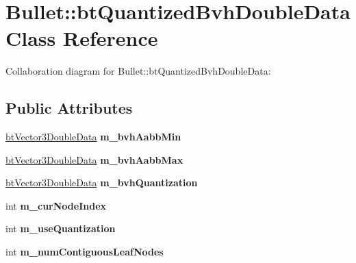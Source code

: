 \hypertarget{class_bullet_1_1bt_quantized_bvh_double_data}{\section{Bullet\+:\+:bt\+Quantized\+Bvh\+Double\+Data Class Reference}
\label{class_bullet_1_1bt_quantized_bvh_double_data}
}


Collaboration diagram for Bullet\+:\+:bt\+Quantized\+Bvh\+Double\+Data\+:
\subsection*{Public Attributes}
\begin{DoxyCompactItemize}
\item 
\hypertarget{class_bullet_1_1bt_quantized_bvh_double_data_a1a8746a4caf220282b2a420b78a5dea5}{\hyperlink{class_bullet_1_1bt_vector3_double_data}{bt\+Vector3\+Double\+Data} {\bfseries m\+\_\+bvh\+Aabb\+Min}}\label{class_bullet_1_1bt_quantized_bvh_double_data_a1a8746a4caf220282b2a420b78a5dea5}

\item 
\hypertarget{class_bullet_1_1bt_quantized_bvh_double_data_a2116db5fae8bed0f51c2e18695ce104f}{\hyperlink{class_bullet_1_1bt_vector3_double_data}{bt\+Vector3\+Double\+Data} {\bfseries m\+\_\+bvh\+Aabb\+Max}}\label{class_bullet_1_1bt_quantized_bvh_double_data_a2116db5fae8bed0f51c2e18695ce104f}

\item 
\hypertarget{class_bullet_1_1bt_quantized_bvh_double_data_a043f201aac3864d7900ea4fbeaae5122}{\hyperlink{class_bullet_1_1bt_vector3_double_data}{bt\+Vector3\+Double\+Data} {\bfseries m\+\_\+bvh\+Quantization}}\label{class_bullet_1_1bt_quantized_bvh_double_data_a043f201aac3864d7900ea4fbeaae5122}

\item 
\hypertarget{class_bullet_1_1bt_quantized_bvh_double_data_a530234283e226efd05f267ed1e249698}{int {\bfseries m\+\_\+cur\+Node\+Index}}\label{class_bullet_1_1bt_quantized_bvh_double_data_a530234283e226efd05f267ed1e249698}

\item 
\hypertarget{class_bullet_1_1bt_quantized_bvh_double_data_ae9949cf1c083097d9717a2a9d219558c}{int {\bfseries m\+\_\+use\+Quantization}}\label{class_bullet_1_1bt_quantized_bvh_double_data_ae9949cf1c083097d9717a2a9d219558c}

\item 
\hypertarget{class_bullet_1_1bt_quantized_bvh_double_data_a71d406f642dbb16eac732434e839e208}{int {\bfseries m\+\_\+num\+Contiguous\+Leaf\+Nodes}}\label{class_bullet_1_1bt_quantized_bvh_double_data_a71d406f642dbb16eac732434e839e208}


\end{DoxyCompactItemize}
